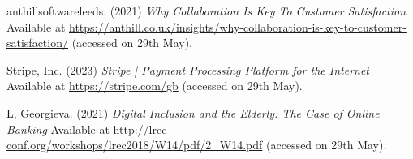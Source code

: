 \noindent [10] anthillsoftwareleeds. (2021) \textit{Why Collaboration Is Key To Customer Satisfaction} Available at \url{https://anthill.co.uk/insights/why-collaboration-is-key-to-customer-satisfaction/} (accessed on 29th May).
\vspace{0.2cm}

\noindent [11] Stripe, Inc. (2023) \textit{Stripe | Payment Processing Platform for the Internet} Available at \url{https://stripe.com/gb} (accessed on 29th May).
\vspace{0.2cm}

\noindent [12] L, Georgieva. (2021) \textit{Digital Inclusion and the Elderly: The Case of Online Banking} Available at \url{http://lrec-conf.org/workshops/lrec2018/W14/pdf/2_W14.pdf} (accessed on 29th May).
\vspace{0.2cm}

\newpage
